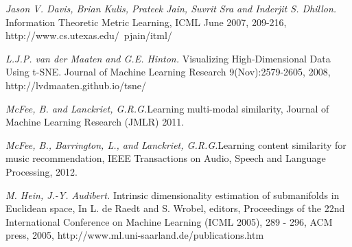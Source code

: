 \documentclass[12pt]{article}
\begin{document}
\begin{thebibliography}{5}
\textit{Jason V. Davis, Brian Kulis, Prateek Jain, Suvrit Sra and Inderjit S. Dhillon.} Information Theoretic Metric Learning, ICML June 2007, 209-216,  http://www.cs.utexas.edu/~pjain/itml/

\textit{L.J.P. van der Maaten and G.E. Hinton.} Visualizing High-Dimensional Data Using t-SNE. Journal of Machine Learning Research 9(Nov):2579-2605, 2008, http://lvdmaaten.github.io/tsne/

\textit{McFee, B. and Lanckriet, G.R.G.}Learning multi-modal similarity, Journal of Machine Learning Research (JMLR) 2011.

 \textit{McFee, B., Barrington, L., and Lanckriet, G.R.G.}Learning content similarity for music recommendation, IEEE Transactions on Audio, Speech and Language Processing, 2012.

\textit{M. Hein, J.-Y. Audibert. }Intrinsic dimensionality estimation of submanifolds in Euclidean space,
In L. de Raedt and S. Wrobel, editors, Proceedings of the 22nd International Conference on Machine Learning (ICML 2005), 289 - 296, ACM press, 2005, http://www.ml.uni-saarland.de/publications.htm


\end{thebibliography}
\end{document}
